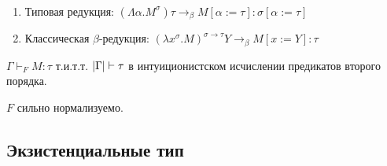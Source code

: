 \begin{definition} \ 
    \begin{enumerate}[label=(\asbuk*)]
        \item Типовая редукция: $\left(\Lambda \alpha . M^\sigma\right) \tau \rightarrow_\beta M[\alpha:=\tau] : \sigma[\alpha := \tau]$
        \item Классическая $\beta$-редукция: $\left(\lambda x^\sigma . M\right)^{\sigma \rightarrow \tau} Y \rightarrow_\beta M [x:=Y] : \tau$
    \end{enumerate}
\end{definition}

\begin{theorem}
    $\Gamma \vdash_F M :\tau$ т.и.т.т. $\left|\Gamma\right| \vdash \tau$ в интуиционистском исчислении предикатов второго порядка.
\end{theorem}

\begin{theorem}
    $F$ сильно нормализуемо.
\end{theorem}

\subsection{Экзистенциальные тип}
